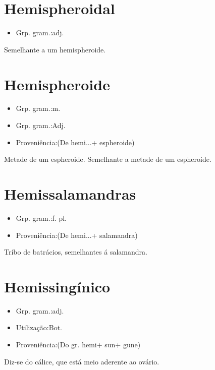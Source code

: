 \documentclass{article}
\begin{document}
\section{Hemispheroidal}
\begin{itemize}
\item {Grp. gram.:adj.}
\end{itemize}
Semelhante a um hemispheroide.
\section{Hemispheroide}
\begin{itemize}
\item {Grp. gram.:m.}
\end{itemize}
\begin{itemize}
\item {Grp. gram.:Adj.}
\end{itemize}
\begin{itemize}
\item {Proveniência:(De \textunderscore hemi...\textunderscore  + \textunderscore espheroide\textunderscore )}
\end{itemize}
Metade de um espheroide.
Semelhante a metade de um espheroide.
\section{Hemissalamandras}
\begin{itemize}
\item {Grp. gram.:f. pl.}
\end{itemize}
\begin{itemize}
\item {Proveniência:(De \textunderscore hemi...\textunderscore  + \textunderscore salamandra\textunderscore )}
\end{itemize}
Tríbo de batrácios, semelhantes á salamandra.
\section{Hemissingínico}
\begin{itemize}
\item {Grp. gram.:adj.}
\end{itemize}
\begin{itemize}
\item {Utilização:Bot.}
\end{itemize}
\begin{itemize}
\item {Proveniência:(Do gr. \textunderscore hemi\textunderscore  + \textunderscore sun\textunderscore  + \textunderscore gune\textunderscore )}
\end{itemize}
Diz-se do cálice, que está meio aderente ao ovário.
\end{document}
